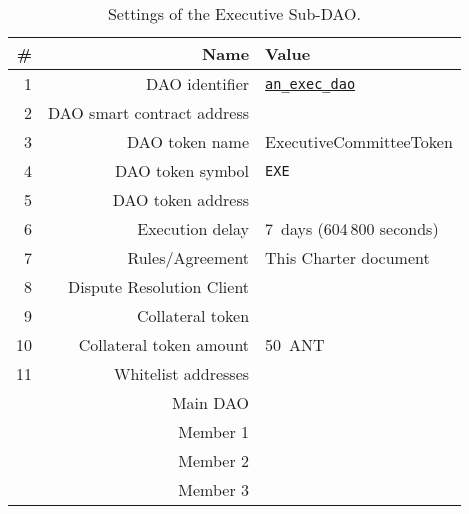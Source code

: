 \begin{table}[h!]
	\caption{Settings of the Executive Sub-DAO.}
	\centering
	\begin{tabular}{rrl}
		\toprule
		\# & Name & Value \\
		\midrule
		1 & \ac{DAO} identifier & \href{https://govern.aragon.org/\#/daos/an_exec_dao}{\texttt{an\_exec\_dao}}\\
		2 & \ac{DAO} smart contract address & \execSubDaoAddr\\
		3 & \ac{DAO} token name & ExecutiveCommitteeToken\\
		4 & \ac{DAO} token symbol & \texttt{EXE}\\
		5 & \ac{DAO} token address & \execSubDaoTokenAddr\\
		6 & Execution delay & 7~days (604\,800 seconds)\\
		7 & Rules/Agreement & This Charter document\\
		8 & Dispute Resolution Client & \aragonCourtAddr\\
		9 & Collateral token & \antTokenAddr\\
		10 & Collateral token amount & 50~\ac{ANT}\\
		11 & Whitelist addresses \\
		& Main \ac{DAO} & \mainDaoAddr\\
		& Member 1 & \execSubDaoMemberAddrI\\
		& Member 2 & \execSubDaoMemberAddrII\\
		& Member 3 & \execSubDaoMemberAddrIII\\
		\bottomrule
	\end{tabular}
\end{table}

\clearpage


